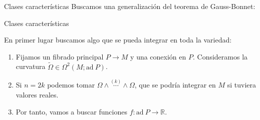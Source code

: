 \documentclass{beamer}
\newcommand{\ad}{\text{ad}}
\newcommand{\RR}{\mathbb{R}}
\begin{document}
\begin{frame}{Clases características}
  Buscamos una generalización del teorema de Gauss-Bonnet:
  
  \end{frame}
  \begin{frame}{Clases características}
  
       En primer lugar buscamos algo que se pueda integrar en toda la variedad:
       \pause
       \begin{enumerate}
	 \item Fijamos un fibrado principal $P\rightarrow M$ y una conexión en $P$. Consideramos la curvatura $\tilde{\Omega} \in \Omega^2(M; \ad\ P)$. 
	   \pause
	 \item Si $n=2k$ podemos tomar $\Omega \wedge \overset{(k)}{\cdots} \wedge \Omega$, que se podría integrar en $M$ si tuviera valores reales.
	   \pause
	 \item Por tanto, vamos a buscar funciones $f:\ad\ P\rightarrow \RR$.
       \end{enumerate}
\end{frame}
\end{document}
